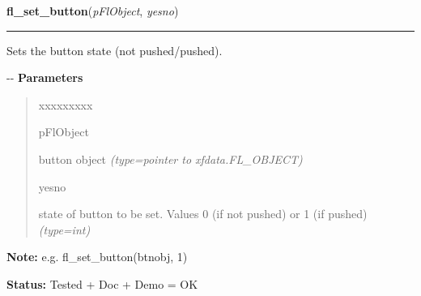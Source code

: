 \hspace{.8\funcindent}\begin{boxedminipage}{\funcwidth}

    \raggedright \textbf{fl\_set\_button}(\textit{pFlObject}, \textit{yesno})

    \vspace{-1.5ex}

    \rule{\textwidth}{0.5\fboxrule}
\setlength{\parskip}{2ex}

Sets the button state (not pushed/pushed).

-{}-
\setlength{\parskip}{1ex}
      \textbf{Parameters}
      \vspace{-1ex}

      \begin{quote}
        \begin{Ventry}{xxxxxxxxx}

          \item[pFlObject]


button object
            {\it (type=pointer to xfdata.FL\_OBJECT)}

          \item[yesno]


state of button to be set. Values 0 (if not pushed) or 1 (if pushed)
            {\it (type=int)}

        \end{Ventry}

      \end{quote}

\textbf{Note:} 
e.g. fl\_set\_button(btnobj, 1)


\textbf{Status:} 
Tested + Doc + Demo = OK


    \end{boxedminipage}

    \label{xformslib:flbutton:fl_get_button_numb}

    \vspace{0.5ex}

